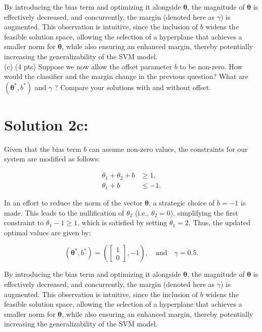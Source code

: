 \documentclass[10pt]{article}
\begin{document}
By introducing the bias term and optimizing it alongside $\boldsymbol{\theta}$, the magnitude of $\boldsymbol{\theta}$ is effectively decreased, and concurrently, the margin (denoted here as $\gamma$) is augmented. This observation is intuitive, since the inclusion of $b$ widens the feasible solution space, allowing the selection of a hyperplane that achieves a smaller norm for $\boldsymbol{\theta}$, while also ensuring an enhanced margin, thereby potentially increasing the generalizability of the SVM model. \\


(c) (4 pts) Suppose we now allow the offset parameter $b$ to be non-zero. How would the classifier and the margin change in the previous question? What are $\left(\boldsymbol{\theta}^{*}, b^{*}\right)$ and $\gamma$ ? Compare your solutions with and without offset.

\section*{Solution 2c:}

Given that the bias term $b$ can assume non-zero values, the constraints for our system are modified as follows:

\begin{align*}
\theta_1 + \theta_2 + b &\geq 1, \\
\theta_1 + b &\leq -1.
\end{align*}

In an effort to reduce the norm of the vector $\boldsymbol{\theta}$, a strategic choice of $b = -1$ is made. This leads to the nullification of $\theta_2$ (i.e., $\theta_2 = 0$), simplifying the first constraint to $\theta_1 - 1 \geq 1$, which is satisfied by setting $\theta_1 = 2$. Thus, the updated optimal values are given by:

\begin{equation*}
(\boldsymbol{\theta}^*, b^*) = \left( \begin{bmatrix} 1 \\ 0 \end{bmatrix}, -1 \right), \quad \text{and} \quad \gamma = 0.5.
\end{equation*}

By introducing the bias term and optimizing it alongside $\boldsymbol{\theta}$, the magnitude of $\boldsymbol{\theta}$ is effectively decreased, and concurrently, the margin (denoted here as $\gamma$) is augmented. This observation is intuitive, since the inclusion of $b$ widens the feasible solution space, allowing the selection of a hyperplane that achieves a smaller norm for $\boldsymbol{\theta}$, while also ensuring an enhanced margin, thereby potentially increasing the generalizability of the SVM model.
\end{document}
